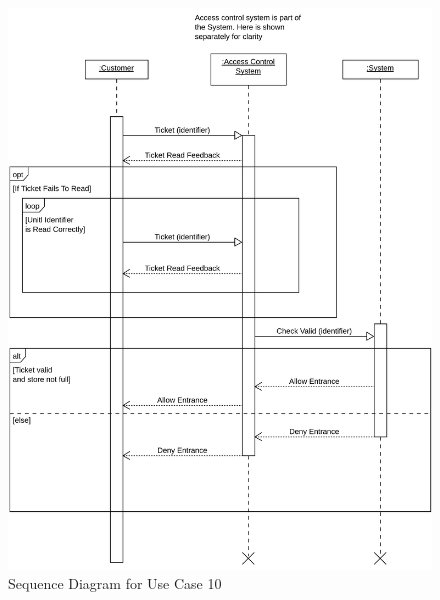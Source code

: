 \begin{figure}[H]
    \includegraphics[width=\textwidth]{Images/UML_Seq_Diag_10.png}
    \caption{\label{fig:Use_Case_Diag}Sequence Diagram for Use Case 10}
\end{figure}

